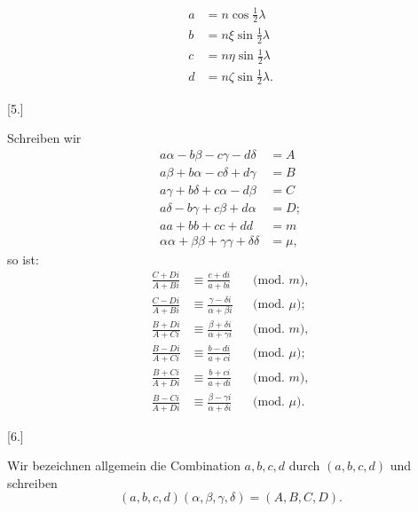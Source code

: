 \[
\begin{aligned}
a&=n\cos\tfrac12\lambda\\
b&=n\xi\sin\tfrac12\lambda\\
c&=n\eta\sin\tfrac12\lambda\\
d&=n\zeta\sin\tfrac12\lambda.
\end{aligned}
\]

\begin{center}[5.]\end{center}

Schreiben wir
\[
\begin{aligned}
a\alpha-b\beta-c\gamma-d\delta&=A\\
a\beta+b\alpha-c\delta+d\gamma&=B\\
a\gamma+b\delta+c\alpha-d\beta&=C\\
a\delta-b\gamma+c\beta+d\alpha&=D;\\
aa+bb+cc+dd&=m\\
\alpha\alpha+\beta\beta+\gamma\gamma+\delta\delta&=\mu,
\end{aligned}
\]
so ist:
\[
\begin{aligned}
\frac{C+Di}{A+Bi}&\equiv\frac{c+di}{a+bi}&&\text{(mod. }m\text{)},\\[3pt]
\frac{C-Di}{A+Bi}&\equiv\frac{\gamma-\delta i}{\alpha+\beta i}&&\text{(mod. }\mu\text{)};\\[12pt]
\frac{B+Di}{A+Ci}&\equiv\frac{\beta+\delta i}{\alpha+\gamma i}&&\text{(mod. }m\text{)},\\[3pt]
\frac{B-Di}{A+Ci}&\equiv\frac{b-di}{a+ci}&&\text{(mod. }\mu\text{)};\\[12pt]
\frac{B+Ci}{A+Di}&\equiv\frac{b+ci}{a+di}&&\text{(mod. }m\text{)},\\[3pt]
\frac{B-Ci}{A+Di}&\equiv\frac{\beta-\gamma i}{\alpha+\delta i}&&\text{(mod. }\mu\text{)}.
\end{aligned}
\]

\begin{center}[6.]\end{center}

Wir bezeichnen allgemein die Combination $a,b,c,d$ durch $(a,b,c,d)$ und schreiben
\[
(a,b,c,d)(\alpha,\beta,\gamma,\delta)=(A,B,C,D).
\]
